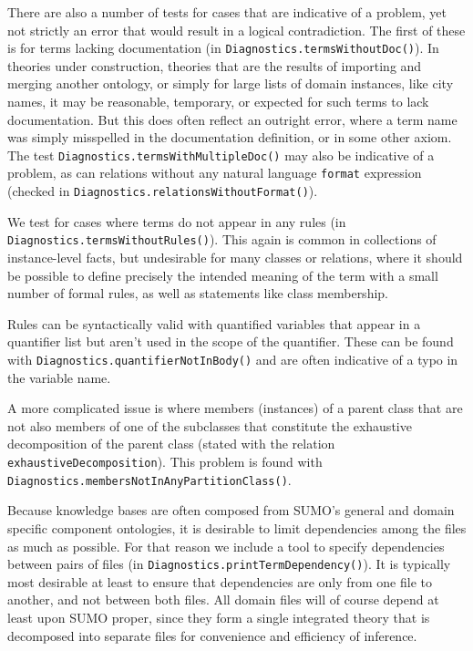 \documentclass{book}
\begin{document}
\begin{sloppypar}
There are also a number of tests for cases that are indicative of a problem, yet
not strictly an error that would result in a logical contradiction.  The first
of these is for terms lacking documentation (in
\texttt{Diagnostics.termsWithoutDoc()}).  In theories under construction,
theories that are the results of importing and merging another ontology, or
simply for large lists of domain instances, like city names, it may be
reasonable, temporary, or expected for such terms to lack documentation.  But
this does often reflect an outright error, where a term name was simply
misspelled in the documentation definition, or in some other axiom.  The test
\texttt{Diagnostics.termsWithMultipleDoc()} may also be indicative of a problem, as
can relations without any natural language \texttt{format} expression (checked in
\texttt{Diagnostics.relationsWithoutFormat()}).
\end{sloppypar}

We test for cases where terms do not appear in any rules (in
\texttt{Diagnostics.termsWithoutRules()}).  This again is common in collections
of instance-level facts, but undesirable for many classes or relations, where it
should be possible to define precisely the intended meaning of the term with a
small number of formal rules, as well as statements like class membership.

Rules can be syntactically valid with quantified variables that appear in a quantifier
list but aren't used in the scope of the quantifier.  These can be found
with \texttt{Diagnostics.quantifierNotInBody()} and are often indicative of
a typo in the variable name.

\begin{sloppypar}
A more complicated issue is where members (instances) of a parent class that are
not also members of one of the subclasses that constitute the exhaustive
decomposition of the parent class (stated with the relation
\texttt{exhaustiveDecomposition}).  This problem is found with
\texttt{Diagnostics.membersNotInAnyPartitionClass()}.
\end{sloppypar}

Because knowledge bases are often composed from SUMO's general and domain
specific component ontologies, it is desirable to limit dependencies among the
files as much as possible.  For that reason we include a tool to specify
dependencies between pairs of files (in
\texttt{Diagnostics.printTermDependency()}).  It is typically most desirable at least to
ensure that dependencies are only from one file to another, and not between both
files.  All domain files will of course depend at least upon SUMO proper, since
they form a single integrated theory that is decomposed into separate files for
convenience and efficiency of inference.
\end{document}
